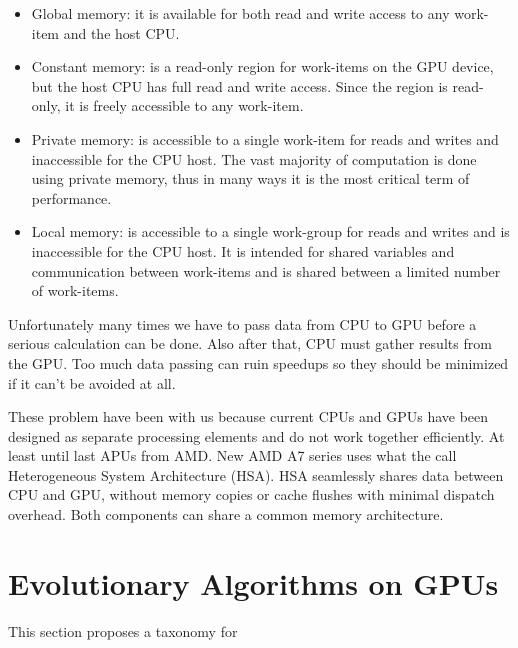 \documentclass[Afour,sageh,times]{sagej}
\begin{document}
\begin{itemize}
\item Global memory: it is available for both read and write access to any work-item and the host CPU.
\item Constant memory: is a read-only region for work-items on the GPU device, but the host CPU has full read and write access. Since the region is read-only, it is freely accessible to any work-item.
\item Private memory: is accessible to a single work-item for reads and writes and inaccessible for the CPU host. The vast majority of computation is done using private memory, thus in many ways it is the most critical term of performance.
\item Local memory: is accessible to a single work-group for reads and writes and is inaccessible for the CPU host. It is intended for shared variables and communication between work-items and is shared between a limited number of work-items.
\end{itemize} 

Unfortunately many times we have to pass data from CPU to GPU before a serious calculation can be done. Also after that, CPU must gather results from the GPU. Too much data passing can ruin speedups so they should be minimized if it can't be avoided at all.

These problem have been with us because current CPUs and GPUs have been designed as separate processing elements and do not work together efficiently. At least until last APUs from AMD. New AMD A7 series uses what the call Heterogeneous System Architecture (HSA). HSA seamlessly shares data between CPU and GPU, without memory copies or cache flushes with minimal dispatch overhead. Both components can share a common memory architecture.


\section{Evolutionary Algorithms on GPUs}
\label{sec:bioinfor_apps}

This section proposes a taxonomy for %
\end{document}
